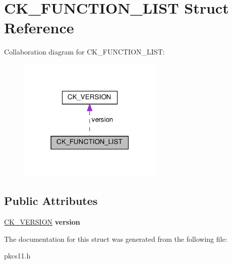 \hypertarget{struct_c_k___f_u_n_c_t_i_o_n___l_i_s_t}{}\section{C\+K\+\_\+\+F\+U\+N\+C\+T\+I\+O\+N\+\_\+\+L\+I\+ST Struct Reference}
\label{struct_c_k___f_u_n_c_t_i_o_n___l_i_s_t}


Collaboration diagram for C\+K\+\_\+\+F\+U\+N\+C\+T\+I\+O\+N\+\_\+\+L\+I\+ST\+:
\nopagebreak
\begin{figure}[H]
\begin{center}
\leavevmode
\includegraphics[width=195pt]{struct_c_k___f_u_n_c_t_i_o_n___l_i_s_t__coll__graph}
\end{center}
\end{figure}
\subsection*{Public Attributes}
\begin{DoxyCompactItemize}
\item 
\mbox{\label{struct_c_k___f_u_n_c_t_i_o_n___l_i_s_t_a2588758f026a49100546d9868754a6c8}} 
\hyperlink{struct_c_k___v_e_r_s_i_o_n}{C\+K\+\_\+\+V\+E\+R\+S\+I\+ON} {\bfseries version}
\end{DoxyCompactItemize}


The documentation for this struct was generated from the following file\+:\begin{DoxyCompactItemize}
\item 
pkcs11.\+h\end{DoxyCompactItemize}
